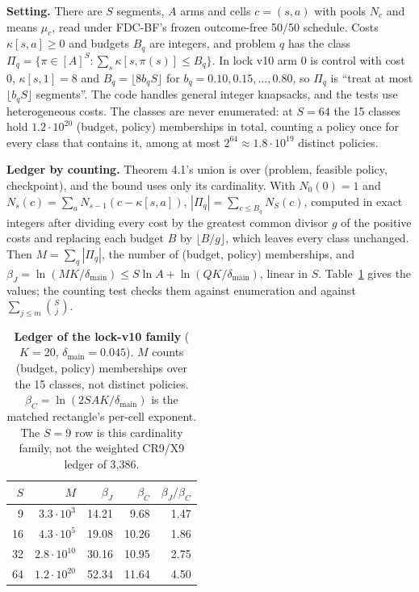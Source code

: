 \documentclass[sigconf,anonymous,review]{acmart}
\newcommand{\dmain}{\delta_{\text{main}}}
\begin{document}
\textbf{Setting.} There are $S$ segments, $A$ arms and cells $c = (s,a)$ with pools $N_c$ and means $\mu_c$, read under FDC-BF's frozen outcome-free 50/50 schedule. Costs $\kappa[s,a] \ge 0$ and budgets $B_q$ are integers, and problem $q$ has the class $\Pi_q = \{\pi \in [A]^S : \sum_s \kappa[s,\pi(s)] \le B_q\}$. In lock v10 arm 0 is control with cost 0, $\kappa[s,1] = 8$ and $B_q = \lfloor 8 b_q S \rfloor$ for $b_q = 0.10, 0.15, \dots, 0.80$, so $\Pi_q$ is ``treat at most $\lfloor b_q S \rfloor$ segments''. The code handles general integer knapsacks, and the tests use heterogeneous costs. The classes are never enumerated: at $S = 64$ the 15 classes hold $1.2 \cdot 10^{20}$ (budget, policy) memberships in total, counting a policy once for every class that contains it, among at most $2^{64} \approx 1.8 \cdot 10^{19}$ distinct policies.

\textbf{Ledger by counting.} Theorem 4.1's union is over (problem, feasible policy, checkpoint), and the bound uses only its cardinality. With $N_0(0) = 1$ and $N_s(c) = \sum_a N_{s-1}(c - \kappa[s,a])$, $|\Pi_q| = \sum_{c \le B_q} N_S(c)$, computed in exact integers after dividing every cost by the greatest common divisor $g$ of the positive costs and replacing each budget $B$ by $\lfloor B/g \rfloor$, which leaves every class unchanged. Then $M = \sum_q |\Pi_q|$, the number of (budget, policy) memberships, and $\beta_J = \ln(MK/\dmain) \le S \ln A + \ln(QK/\dmain)$, linear in $S$. Table~\ref{tab:v10ledger} gives the values; the counting test checks them against enumeration and against $\sum_{j \le m}\binom{S}{j}$.

\begin{table}[H]
\caption{\textbf{Ledger of the lock-v10 family} ($K = 20$, $\dmain = 0.045$). $M$ counts (budget, policy) memberships over the 15 classes, not distinct policies. $\beta_C = \ln(2SAK/\dmain)$ is the matched rectangle's per-cell exponent. The $S = 9$ row is this cardinality family, not the weighted CR9/X9 ledger of 3,386.}
\label{tab:v10ledger}
\footnotesize
\begin{tabular}{@{}rrrrr@{}}
\toprule
$S$ & $M$ & $\beta_J$ & $\beta_C$ & $\beta_J/\beta_C$ \\
\midrule
9 & $3.3 \cdot 10^{3}$ & 14.21 & 9.68 & 1.47 \\
16 & $4.3 \cdot 10^{5}$ & 19.08 & 10.26 & 1.86 \\
32 & $2.8 \cdot 10^{10}$ & 30.16 & 10.95 & 2.75 \\
64 & $1.2 \cdot 10^{20}$ & 52.34 & 11.64 & 4.50 \\
\bottomrule
\end{tabular}
\end{table}
\end{document}
